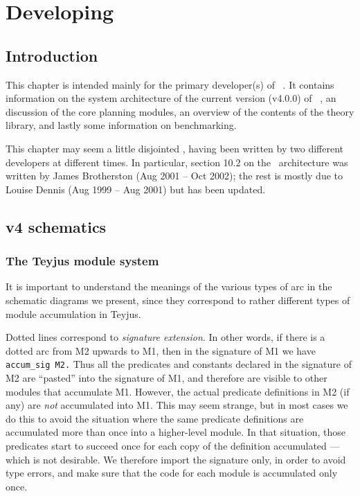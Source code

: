 \chapter{Developing \lclam\ }
\label{developer}

\section{Introduction}
This chapter is intended mainly for the primary developer(s) of
\lclam\ .  It contains information on the system architecture of the
current version (v4.0.0) of \lclam\ , an discussion of the core
planning modules, an overview of the contents of the theory library,
and lastly some information on benchmarking.

This chapter may seem a little disjointed , having been written by two
different developers at different times.  In particular, section 10.2
on the \lclam\ architecture was written by James Brotherston (Aug 2001
-- Oct 2002); the rest is mostly due to Louise Dennis (Aug 1999 -- Aug
2001) but has been updated.

\section{\lclam v4 schematics}

\subsection{The Teyjus module system}

It is important to understand the meanings of the various types of arc
in the schematic diagrams we present, since they correspond to rather
different types of module accumulation in Teyjus.

Dotted lines correspond to \emph{signature extension}.  In other
words, if there is a dotted arc from M2 upwards to M1, then in the
signature of M1 we have {\tt accum\_sig M2.}  Thus all the predicates
and constants declared in the signature of M2 are ``pasted'' into the
signature of M1, and therefore are visible to other modules that accumulate
M1.  However, the actual predicate definitions in M2 (if any) are
\emph{not} accumulated into M1.  This may seem strange, but in most
cases we do this to avoid the situation where the same predicate
definitions are accumulated more than once into a higher-level module.
In that situation, those predicates start to succeed once for each
copy of the definition accumulated --- which is not desirable.  We
therefore import the signature only, in order to avoid type errors,
and make sure that the code for each module is accumulated only once.

